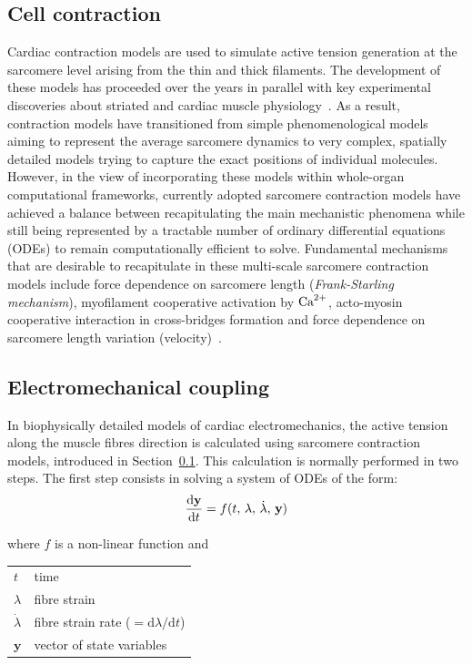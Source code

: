 %
%
%
\subsection{Cell contraction}\label{sec:cell_contr_modelling}
Cardiac contraction models are used to simulate active tension generation at the sarcomere level arising from the thin and thick filaments. The development of these models has proceeded over the years in parallel with key experimental discoveries about striated and cardiac muscle physiology~\cite{Niederer:2019}. As a result, contraction models have transitioned from simple phenomenological models aiming to represent the average sarcomere dynamics to very complex, spatially detailed models trying to capture the exact positions of individual molecules. However, in the view of incorporating these models within whole-organ computational frameworks, currently adopted sarcomere contraction models have achieved a balance between recapitulating the main mechanistic phenomena while still being represented by a tractable number of ordinary differential equations (\acs{ODE}s) to remain computationally efficient to solve. Fundamental mechanisms that are desirable to recapitulate in these multi-scale sarcomere contraction models include force dependence on sarcomere length (\textit{Frank-Starling mechanism}), myofilament cooperative activation by $\textrm{Ca}^{2+}$, acto-myosin cooperative interaction in cross-bridges formation and force dependence on sarcomere length variation (velocity)~\cite{Niederer:2019}.


%
%
%
\subsection{Electromechanical coupling}\label{sec:mathelecmechcoupl}
In biophysically detailed models of cardiac electromechanics, the active tension along the muscle fibres direction is calculated using sarcomere contraction models, introduced in Section~\ref{sec:cell_contr_modelling}. This calculation is normally performed in two steps. The first step consists in solving a system of ODEs of the form:
%
\begin{equation}\label{eq:epmechcoupling}
    \dfrac{\mathrm{d}{\mathbf{y}}}{\mathrm{d}{t}} = f(t,\,\lambda,\,\dot{\lambda},\,\mathbf{y}) 
\end{equation}

\noindent
where $f$ is a non-linear function and

\vspace{0.2cm}
\begin{tabular}{ll}
    $t$             & time \\
    $\lambda$       & fibre strain \\
    $\dot{\lambda}$ & fibre strain rate ($=\mathrm{d}\lambda / \mathrm{d}t$) \\
    $\mathbf{y}$    & vector of state variables
\end{tabular}

